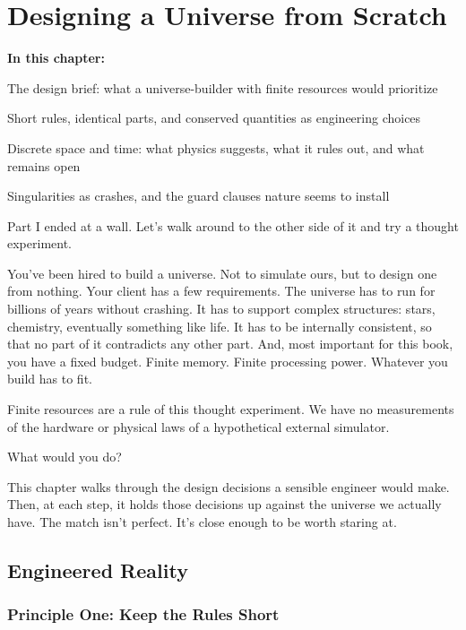\chapter{Designing a Universe from Scratch}

\begin{chaptermapbox}
\textbf{In this chapter:}
\begin{compactchecklist}
\item The design brief: what a universe-builder with finite resources would prioritize
\item Short rules, identical parts, and conserved quantities as engineering choices
\item Discrete space and time: what physics suggests, what it rules out, and what remains open
\item Singularities as crashes, and the guard clauses nature seems to install
\end{compactchecklist}
\end{chaptermapbox}

Part I ended at a wall. Let's walk around to the other side of it and try a thought experiment.

You've been hired to build a universe. Not to simulate ours, but to design one from nothing. Your client has a few requirements. The universe has to run for billions of years without crashing. It has to support complex structures: stars, chemistry, eventually something like life. It has to be internally consistent, so that no part of it contradicts any other part. And, most important for this book, you have a fixed budget. Finite memory. Finite processing power. Whatever you build has to fit.

Finite resources are a rule of this thought experiment. We have no measurements of the hardware or physical laws of a hypothetical external simulator.

What would you do?

This chapter walks through the design decisions a sensible engineer would make. Then, at each step, it holds those decisions up against the universe we actually have. The match isn't perfect. It's close enough to be worth staring at.

\section{Engineered Reality}

\subsection{Principle One: Keep the Rules Short}

